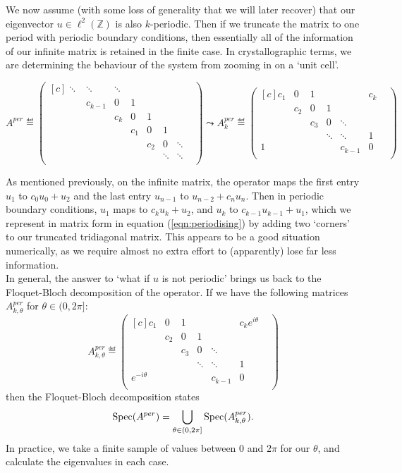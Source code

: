 \documentclass[../main.tex]{subfiles}
\begin{document}
We now assume (with some loss of generality that we will later recover) that our
eigenvector $u \in \ell^2(\mathbb{Z})$ is also $k$-periodic. Then if we truncate
the matrix to one period with periodic boundary conditions, then essentially all
of the information of our infinite matrix is retained in the finite case. In
crystallographic terms, we are determining the behaviour of the system from
zooming in on a `unit cell'.

\begin{equation}
\label{eqn:periodising}
  A^{per} \eqdef
  \begin{pmatrix*}[c]
    \ddots & \ddots & \ddots & & & & \\
    & c_{k-1} & 0 & 1 & & & & \\
    & & c_{k} & 0 & 1 & & & \\
    & & & c_1 & 0 & 1 & \\
    & & &  & c_2 & 0 & \ddots \\
    & & & & & \ddots & \ddots & \\
  \end{pmatrix*}
  \leadsto 
  A^{per}_k \eqdef
  \begin{pmatrix*}[c]
    c_1 & 0 & 1 & & & c_{k}\\
    & c_2 & 0 & 1 & & & \\
    & & c_3 & 0 & \ddots & & \\
    & & & \ddots & \ddots & 1 & \\
    1 & & & & c_{k-1} & 0\\ 
  \end{pmatrix*}
\end{equation}

As mentioned previously, on the infinite matrix, the operator maps the first
entry $u_1$ to $c_0 u_0 + u_2$ and the last entry $u_{n-1}$ to $u_{n-2} + c_{n}
u_{n}$. Then in periodic boundary conditions, $u_1$ maps to $c_k u_k + u_2$, and
$u_{k}$ to $c_{k-1} u_{k-1} + u_{1}$, which we represent in matrix form in
equation (\ref{eqn:periodising}) by adding two `corners' to our truncated
tridiagonal matrix. This appears to be a good situation numerically, as we
require almost no extra effort to (apparently) lose far less information.\\

In general, the answer to `what if $u$ is not periodic' brings us back to the
Floquet-Bloch decomposition of the operator. If we have the following matrices
$A^{per}_{k, \theta}$ for $\theta \in (0, 2 \pi]$:
  $$ 
  A^{per}_{k, \theta} \eqdef
  \begin{pmatrix*}[c]
    c_1 & 0 & 1 & & & c_{k} e^{i \theta}\\
    & c_2 & 0 & 1 & & & \\
    & & c_3 & 0 & \ddots & & \\
    & & & \ddots & \ddots & 1 & \\
    e^{- i \theta} & & & & c_{k-1} & 0 \\
  \end{pmatrix*} 
  $$
then the Floquet-Bloch decomposition states 
  $$\mathrm{Spec}(A^{per}) = \bigcup_{\theta \in (0, 2 \pi]} \mathrm{Spec}(A^{per}_{k, \theta}).$$
In practice, we take a finite sample of values between 0 and $2 \pi$ for our
$\theta$, and calculate the eigenvalues in each case. 
\end{document}
